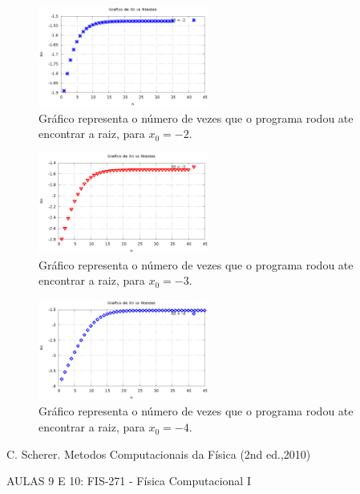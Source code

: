 \documentclass[a4wide]{report}
\begin{document}
\begin{figure}[h]
\centering
\includegraphics[width=0.5\textwidth]{grafico_do_ex01d_x=-2}
\caption{Gráfico representa o número de vezes que o programa rodou ate encontrar a raiz, para $x_0 = -2$.}
\label{ex01a1.4}
\end{figure}
\begin{figure}[h]
\centering
\includegraphics[width=0.5\textwidth]{grafico_do_ex01d_x=-3}
\caption{Gráfico representa o número de vezes que o programa rodou ate encontrar a raiz, para $x_0 = -3$.}
\label{ex01a1.5}
\end{figure}
\begin{figure}[h]
\centering
\includegraphics[width=0.5\textwidth]{grafico_do_ex01d_x=-4}
\caption{Gráfico representa o número de vezes que o programa rodou ate encontrar a raiz, para $x_0 = -4$.}
\label{ex01a1.6}
\end{figure}


\begin{thebibliography}{99}

 C. Scherer. Metodos Computacionais da Física (2nd ed.,2010)

 AULAS 9 E 10: FIS-271 - Física Computacional I

\end{thebibliography}
\end{document}
